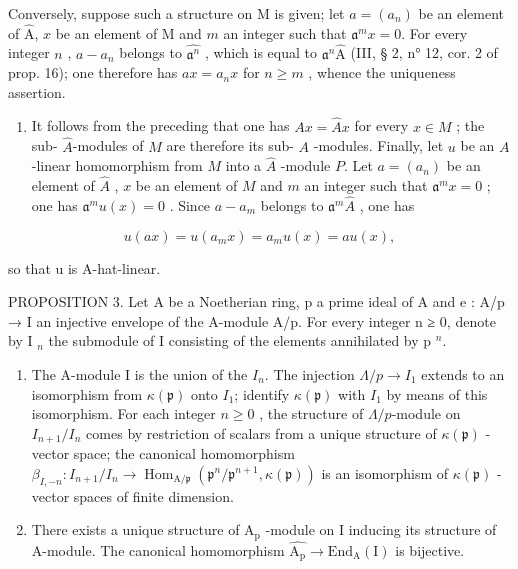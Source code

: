 Conversely, suppose such a structure on M is given; let \(a = (a_{n})\) be an element of \(\widehat{\mathrm{A}}\), \(x\) be an element of M and \(m\) an integer such that \(\mathfrak{a}^{m}x = 0\). For every integer \(n\) , \(a - a_{n}\) belongs to \(\widehat{\mathfrak{a}^{n}}\) , which is equal to \(\mathfrak{a}^{n}\widehat{\mathrm{A}}\) (III, § 2, n° 12, cor. 2 of prop. 16); one therefore has \(ax = a_{n}x\) for \(n \geqslant m\) , whence the uniqueness assertion.

\begin{enumerate}
\def\labelenumi{\alph{enumi})}
\setcounter{enumi}{1}
\tightlist
\item
  It follows from the preceding that one has \(Ax = \widehat{A}x\) for every \(x \in M\) ; the sub- \(\widehat{A}\)-modules of \(M\) are therefore its sub- \(A\) -modules. Finally, let \(u\) be an \(A\)-linear homomorphism from \(M\) into a \(\widehat{A}\) -module \(P\). Let \(a = (a_n)\) be an element of \(\widehat{A}\) , \(x\) be an element of \(M\) and \(m\) an integer such that \(\mathfrak{a}^m x = 0\) ; one has \(\mathfrak{a}^m u(x) = 0\) . Since \(a - a_m\) belongs to \(\mathfrak{a}^m\widehat{A}\) , one has
\end{enumerate}

\[
u (a x) = u \left(a _ {m} x\right) = a _ {m} u (x) = a u (x),
\]

so that u is A-hat-linear.

PROPOSITION 3. Let A be a Noetherian ring, p a prime ideal of A and e : A/p → I an injective envelope of the A-module A/p. For every integer n ≥ 0, denote by I \(_{n}\) the submodule of I consisting of the elements annihilated by p \(^{n}\).

\begin{enumerate}
\def\labelenumi{\alph{enumi})}
\item
  The A-module I is the union of the \(I_{n}\). The injection \(\Lambda/p \to I_{1}\) extends to an isomorphism from \(\kappa(\mathfrak{p})\) onto \(I_{1}\); identify \(\kappa(\mathfrak{p})\) with \(I_{1}\) by means of this isomorphism. For each integer \(n \geqslant 0\) , the structure of \(\Lambda/p\)-module on \(I_{n+1}/I_{n}\) comes by restriction of scalars from a unique structure of \(\kappa(\mathfrak{p})\) -vector space; the canonical homomorphism \(\beta_{I,-n}: I_{n+1}/I_{n} \longrightarrow \operatorname{Hom}_{\mathrm{A}/\mathfrak{p}}(\mathfrak{p}^{n}/\mathfrak{p}^{n+1}, \kappa(\mathfrak{p}))\) is an isomorphism of \(\kappa(\mathfrak{p})\) -vector spaces of finite dimension.
\item
  There exists a unique structure of \(\mathrm{A_p}\) -module on I inducing its structure of A-module. The canonical homomorphism \(\widehat{\mathrm{A_p}} \longrightarrow \mathrm{End}_{\mathrm{A}}(\mathrm{I})\) is bijective.
\end{enumerate}

